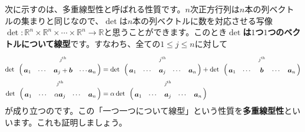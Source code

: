 次に示すのは、多重線型性と呼ばれる性質です。$n$次正方行列は$n$本の列ベクトルの集まりと同じなので、$\det$は$n$本の列ベクトルに数を対応させる写像$\det\colon \mathbb{R}^n \times \mathbb{R}^n \times \cdots \times \mathbb{R}^n\rightarrow \mathbb{R}$と思うことができます。このとき\textbf{$\det$は$1$つ$1$つのベクトルについて線型}です。すなわち、全ての$1 \leq j \leq n$に対して
\begin{align*}
\det
\bordermatrix{
& & & \scalebox{0.8}{$j^{\text{th}}$} \cr
& \bm{a}_1 & \cdots & \bm{a}_j + \bm{b} & \cdots \bm{a}_n
}
&=
\det \bordermatrix{
& & & \scalebox{0.8}{$j^{\text{th}}$} \cr
& \bm{a}_1 & \cdots & \bm{a}_j & \cdots & \bm{a}_n
}
+ \det \bordermatrix{
& & & \scalebox{0.8}{$j^{\text{th}}$} \cr
& \bm{a}_1 & \cdots & \bm{b} & \cdots & \bm{a}_n
} \\
\det
\bordermatrix{
& & & \scalebox{0.8}{$j^{\text{th}}$} \cr
& \bm{a}_1 & \cdots & \alpha \bm{a}_j & \cdots & \bm{a}_n
}
&=
\alpha \det \bordermatrix{
& & & \scalebox{0.8}{$j^{\text{th}}$} \cr
& \bm{a}_1 & \cdots & \bm{a}_j & \cdots & \bm{a}_n
}
\end{align*}
が成り立つのです。この「一つ一つについて線型」という性質を\textbf{多重線型性}といいます。これも証明しましょう。

